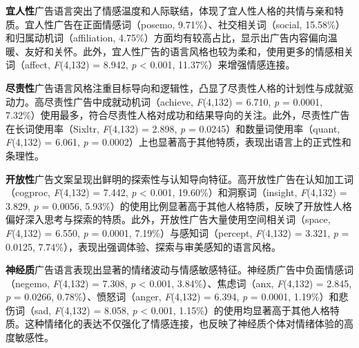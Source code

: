 \textbf{宜人性}广告语言突出了情感温度和人际联结，体现了宜人性人格的共情与亲和特质。宜人性广告在正面情感词（posemo, 9.71\%）、社交相关词（social, 15.58\%）和归属动机词（affiliation, 4.75\%）方面均有较高占比，显示出广告内容偏向温暖、友好和关怀。此外，宜人性广告的语言风格也较为柔和，使用更多的情感相关词（affect, \textit{F}(4,132) = 8.942, \textit{p} < 0.001, 11.37\%）来增强情感连接。

\textbf{尽责性}广告语言风格注重目标导向和逻辑性，凸显了尽责性人格的计划性与成就驱动力。高尽责性广告中成就动机词（achieve, \textit{F}(4,132) = 6.710, \textit{p} = 0.0001, 7.32\%）使用最多，符合尽责性人格对成功和结果导向的关注。此外，尽责性广告在长词使用率（Sixltr, \textit{F}(4,132) = 2.898, \textit{p} = 0.0245）和数量词使用率（quant, \textit{F}(4,132) = 6.061, \textit{p} = 0.0002）上也显著高于其他特质，表现出语言上的正式性和条理性。

\textbf{开放性}广告文案呈现出鲜明的探索性与认知导向特征。高开放性广告在认知加工词（cogproc, \textit{F}(4,132) = 7.442, \textit{p} < 0.001, 19.60\%）和洞察词（insight, \textit{F}(4,132) = 3.829, \textit{p} = 0.0056, 5.93\%）的使用比例显著高于其他人格特质，反映了开放性人格偏好深入思考与探索的特质。此外，开放性广告大量使用空间相关词（space, \textit{F}(4,132) = 6.550, \textit{p} = 0.0001, 7.19\%）与感知词（percept, \textit{F}(4,132) = 3.321, \textit{p} = 0.0125, 7.74\%），表现出强调体验、探索与审美感知的语言风格。

\textbf{神经质}广告语言表现出显著的情绪波动与情感敏感特征。神经质广告中负面情感词（negemo, \textit{F}(4,132) = 7.308, \textit{p} < 0.001, 3.84\%）、焦虑词（anx, \textit{F}(4,132) = 2.845, \textit{p} = 0.0266, 0.78\%）、愤怒词（anger, \textit{F}(4,132) = 6.394, \textit{p} = 0.0001, 1.19\%）和悲伤词（sad, \textit{F}(4,132) = 8.058, \textit{p} < 0.001, 1.15\%）的使用均显著高于其他人格特质。这种情绪化的表达不仅强化了情感连接，也反映了神经质个体对情绪体验的高度敏感性。


